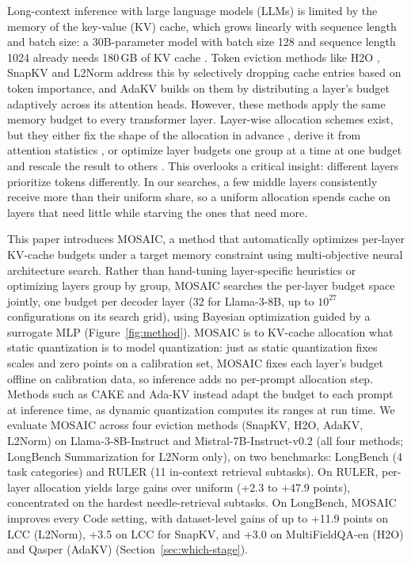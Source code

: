 \documentclass[11pt]{article}
\begin{document}
Long-context inference with large language models (LLMs) is limited by the memory of the key-value (KV) cache, which grows linearly with sequence length and batch size: a 30B-parameter model with batch size 128 and sequence length 1024 already needs 180\,GB of KV cache \citep{zhang2023h2o}. Token eviction methods like H2O \citep{zhang2023h2o}, SnapKV \citep{li2024snapkv} and L2Norm \citep{devoto2024l2norm} address this by selectively dropping cache entries based on token importance, and AdaKV \citep{feng2025adakv} builds on them by distributing a layer's budget adaptively across its attention heads. However, these methods apply the same memory budget to every transformer layer. Layer-wise allocation schemes exist, but they either fix the shape of the allocation in advance \citep{cai2025pyramidkv}, derive it from attention statistics \citep{qin2025cake}, or optimize layer budgets one group at a time at one budget and rescale the result to others \citep{yu2025evolkv}. This overlooks a critical insight: different layers prioritize tokens differently. In our searches, a few middle layers consistently receive more than their uniform share, so a uniform allocation spends cache on layers that need little while starving the ones that need more.

This paper introduces MOSAIC, a method that automatically optimizes per-layer KV-cache budgets under a target memory constraint using multi-objective neural architecture search. Rather than hand-tuning layer-specific heuristics or optimizing layers group by group, MOSAIC searches the per-layer budget space jointly, one budget per decoder layer (32 for Llama-3-8B, up to $10^{27}$ configurations on its search grid), using Bayesian optimization guided by a surrogate MLP (Figure~\ref{fig:method}). MOSAIC is to KV-cache allocation what static quantization is to model quantization: just as static quantization fixes scales and zero points on a calibration set, MOSAIC fixes each layer's budget offline on calibration data, so inference adds no per-prompt allocation step. Methods such as CAKE and Ada-KV instead adapt the budget to each prompt at inference time, as dynamic quantization computes its ranges at run time. We evaluate MOSAIC across four eviction methods (SnapKV, H2O, AdaKV, L2Norm) on Llama-3-8B-Instruct and Mistral-7B-Instruct-v0.2 (all four methods; LongBench Summarization for L2Norm only), on two benchmarks: LongBench (4 task categories) and RULER (11 in-context retrieval subtasks). On RULER, per-layer allocation yields large gains over uniform (+2.3 to +47.9 points), concentrated on the hardest needle-retrieval subtasks. On LongBench, MOSAIC improves every Code setting, with dataset-level gains of up to +11.9 points on LCC (L2Norm), +3.5 on LCC for SnapKV, and +3.0 on MultiFieldQA-en (H2O) and Qasper (AdaKV) (Section~\ref{sec:which-stage}).
\end{document}
